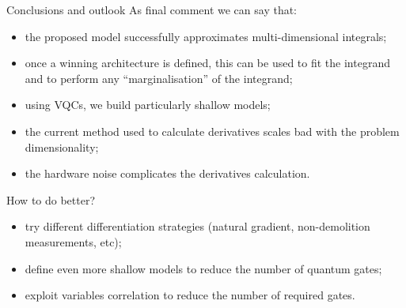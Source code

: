 \documentclass[8pt, xcolor={svgnames}, hyperref={linkcolor=black}]{beamer}
\begin{document}
\begin{frame}{Conclusions and outlook}
As final comment we can say that:
\begin{itemize}[noitemsep]
\item[\faThumbsOUp] the proposed model successfully approximates multi-dimensional integrals;
\item[\faThumbsOUp] once a winning architecture is defined, this can be used to fit the integrand
and to perform any ``marginalisation'' of the integrand;
\item[\faThumbsOUp] using VQCs, we build particularly shallow models;
\item[\faThumbsODown] the current method used to calculate derivatives scales bad 
with the problem dimensionality;
\item[\faThumbsODown] the hardware noise complicates the derivatives calculation.
\end{itemize}

How to do better?
\begin{itemize}[noitemsep]
\item[\faSend] try different differentiation strategies (natural gradient, non-demolition
measurements, etc);
\item[\faSend] define even more shallow models to reduce the number of quantum gates;
\item[\faSend] exploit variables correlation to reduce the number of required gates.
\end{itemize}
\end{frame}
\end{document}
